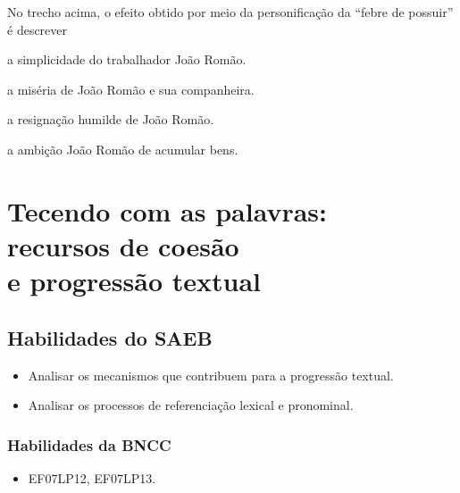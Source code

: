 No trecho acima, o efeito obtido por meio da personificação da ``febre de possuir'' é descrever

\begin{escolha}
  
  \item a simplicidade do trabalhador João Romão. 
  
  \item a miséria de João Romão e sua companheira.
  
  \item a resignação humilde de João Romão. 
  
  \item a ambição João Romão de acumular bens. 

\end{escolha}


\chapter[Tecendo com as palavras: recursos de coesão e progressão textual]{Tecendo com as palavras:\\ recursos de coesão\\ e progressão textual}

\vspace*{1cm}

\section*{Habilidades do SAEB}

\begin{itemize}

  \item Analisar os mecanismos que contribuem para a progressão textual.

  \item Analisar os processos de referenciação lexical e pronominal.

\end{itemize}


\subsection{Habilidades da BNCC}

\begin{itemize}

  \item EF07LP12, EF07LP13.

\end{itemize}

